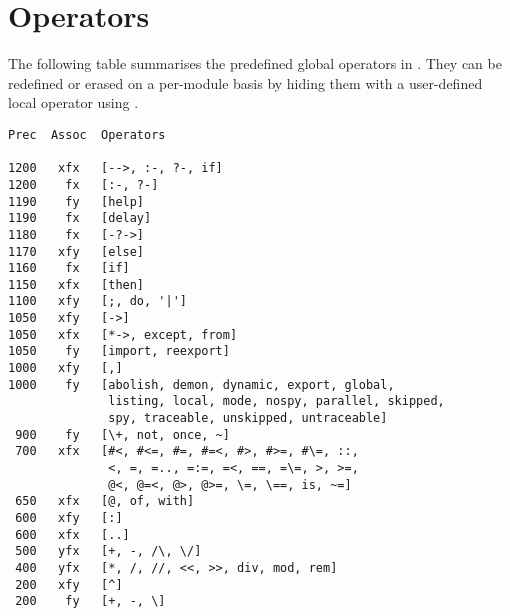 %
% 
% 
% 
% 
%
%
%
%
%
%
%

\chapter{Operators}
\label{chapopers}

%
%

The following table summarises the predefined global operators in {\eclipse}.
They can be redefined or erased on a per-module basis by hiding them
with a user-defined local operator using
.
\begin{verbatim}
Prec  Assoc  Operators

1200   xfx   [-->, :-, ?-, if]
1200    fx   [:-, ?-]
1190    fy   [help]
1190    fx   [delay]
1180    fx   [-?->]
1170   xfy   [else]
1160    fx   [if]
1150   xfx   [then]
1100   xfy   [;, do, '|']
1050   xfy   [->]
1050   xfx   [*->, except, from]
1050    fy   [import, reexport]
1000   xfy   [,]
1000    fy   [abolish, demon, dynamic, export, global,
              listing, local, mode, nospy, parallel, skipped,
              spy, traceable, unskipped, untraceable]
 900    fy   [\+, not, once, ~]
 700   xfx   [#<, #<=, #=, #=<, #>, #>=, #\=, ::,
              <, =, =.., =:=, =<, ==, =\=, >, >=,
              @<, @=<, @>, @>=, \=, \==, is, ~=]
 650   xfx   [@, of, with]
 600   xfy   [:]
 600   xfx   [..]
 500   yfx   [+, -, /\, \/]
 400   yfx   [*, /, //, <<, >>, div, mod, rem]
 200   xfy   [^]
 200    fy   [+, -, \]
\end{verbatim}
